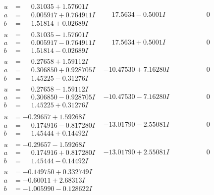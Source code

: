 \documentclass[1p]{elsarticle_modified}
\theoremstyle{definition}
\begin{document}
$$\begin{array}{c|c|c}
\begin{aligned}
u &= \phantom{-}0.31035 + 1.57601 I \\
a &= \phantom{-}0.005917 + 0.764911 I \\
b &= \phantom{-}1.51814 + 0.02689 I\end{aligned}
 & \phantom{-}17.5634 - 0.5001 I & \phantom{-0.000000 } 0 \\ \hline\begin{aligned}
u &= \phantom{-}0.31035 - 1.57601 I \\
a &= \phantom{-}0.005917 - 0.764911 I \\
b &= \phantom{-}1.51814 - 0.02689 I\end{aligned}
 & \phantom{-}17.5634 + 0.5001 I & \phantom{-0.000000 } 0 \\ \hline\begin{aligned}
u &= \phantom{-}0.27658 + 1.59112 I \\
a &= \phantom{-}0.306850 + 0.928705 I \\
b &= \phantom{-}1.45225 - 0.31276 I\end{aligned}
 & -10.47530 + 7.16280 I & \phantom{-0.000000 } 0 \\ \hline\begin{aligned}
u &= \phantom{-}0.27658 - 1.59112 I \\
a &= \phantom{-}0.306850 - 0.928705 I \\
b &= \phantom{-}1.45225 + 0.31276 I\end{aligned}
 & -10.47530 - 7.16280 I & \phantom{-0.000000 } 0 \\ \hline\begin{aligned}
u &= -0.29657 + 1.59268 I \\
a &= \phantom{-}0.174916 - 0.817280 I \\
b &= \phantom{-}1.45444 + 0.14492 I\end{aligned}
 & -13.01790 - 2.55081 I & \phantom{-0.000000 } 0 \\ \hline\begin{aligned}
u &= -0.29657 - 1.59268 I \\
a &= \phantom{-}0.174916 + 0.817280 I \\
b &= \phantom{-}1.45444 - 0.14492 I\end{aligned}
 & -13.01790 + 2.55081 I & \phantom{-0.000000 } 0 \\ \hline\begin{aligned}
u &= -0.149750 + 0.332749 I \\
a &= -0.60011 + 2.68313 I \\
b &= -1.005990 - 0.128622 I\end{aligned}

\end{array}$$
\end{document}

